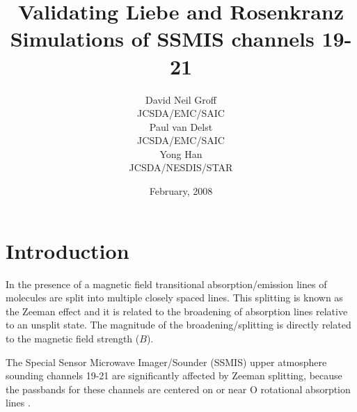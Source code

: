 

\newcommand{\microtesla}{\ensuremath{\mu\textrm{T}}}
\newcommand{\degree}{\ensuremath{^\circ}}

\title{Validating Liebe and Rosenkranz Simulations of SSMIS channels 19-21}
\author{David Neil Groff\\JCSDA/EMC/SAIC\\[0.25in]
        Paul van Delst\\JCSDA/EMC/SAIC\\[0.25in]
        Yong Han\\JCSDA/NESDIS/STAR}
\date{February, 2008}



\maketitle

\section{Introduction}
In the presence of a magnetic field transitional absorption/emission lines of molecules are split into multiple closely spaced lines. This splitting is known as the Zeeman effect and it is related to the broadening of absorption lines relative to an unsplit state. The magnitude of the broadening/splitting is directly related to the magnetic field strength ($B$).

The Special Sensor Microwave Imager/Sounder (SSMIS) upper atmosphere sounding channels 19-21 are significantly affected by Zeeman splitting, because the passbands for these channels are centered on or near O rotational absorption lines \cite{Han2007}. 

